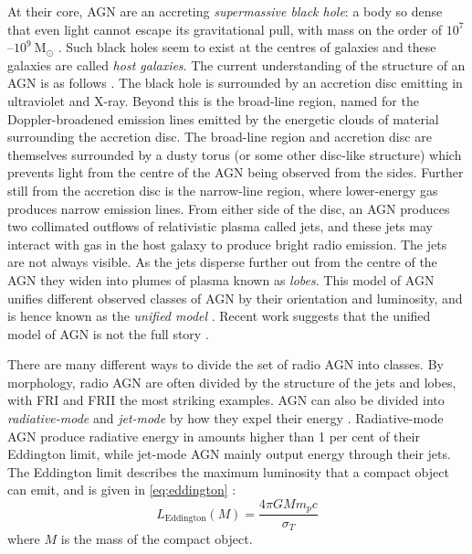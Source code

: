 \documentclass[11pt, a4paper]{book}
\newcommand{\defn}[1]{\emph{#1}}
\begin{document}
        At their core, AGN are an accreting \defn{supermassive black hole}: a body so dense that even light cannot escape its gravitational pull, with mass on the order of $10^7$--$10^9\ \mathrm{M}_\odot$ \citep{marconi_relation_2003}. Such black holes seem to exist at the centres of galaxies and these galaxies are called \defn{host galaxies}. The current understanding of the structure of an AGN is as follows \citep{urry95unified}. The black hole is surrounded by an accretion disc emitting in ultraviolet and X-ray. Beyond this is the broad-line region, named for the Doppler-broadened emission lines emitted by the energetic clouds of material surrounding the accretion disc. The broad-line region and accretion disc are themselves surrounded by a dusty torus (or some other disc-like structure) which prevents light from the centre of the AGN being observed from the sides. Further still from the accretion disc is the narrow-line region, where lower-energy gas produces narrow emission lines. From either side of the disc, an AGN produces two collimated outflows of relativistic plasma called {jets}, and these jets may interact with gas in the host galaxy to produce bright radio emission. The jets are not always visible. As the jets disperse further out from the centre of the AGN they widen into plumes of plasma known as \defn{lobes}. This model of AGN unifies different observed classes of AGN by their orientation and luminosity, and is hence known as the \defn{unified model} \citep{antonucci_unified_1993}. Recent work suggests that the unified model of AGN is not the full story \citep[e.g.][]{zhuang_interplay_2020}.

        There are many different ways to divide the set of radio AGN into classes. By morphology, radio AGN are often divided by the structure of the jets and lobes, with FRI and FRII the most striking examples. AGN can also be divided into \defn{radiative-mode} and \defn{jet-mode} by how they expel their energy \citep{heckman_coevolution_2014}. Radiative-mode AGN produce radiative energy in amounts higher than 1 per cent of their Eddington limit, while jet-mode AGN mainly output energy through their jets. The Eddington limit describes the maximum luminosity that a compact object can emit, and is given in \autoref{eq:eddington} \citep{rybicki_radiative_2008}:
        \begin{equation}
            L_{\mathrm{Eddington}}(M) = \frac{4\pi G M m_p c}{\sigma_T}
            \label{eq:eddington}
        \end{equation}
        where $M$ is the mass of the compact object.
\end{document}
